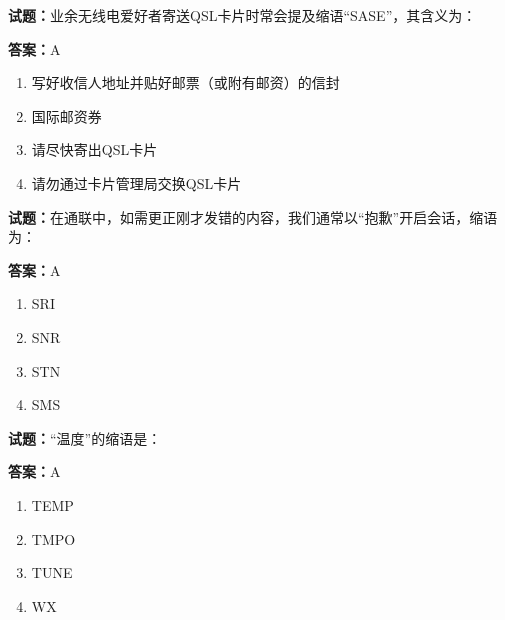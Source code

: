 \documentclass{ctexbook}
\begin{document}




\vspace{1em}

\textbf{试题：}业余无线电爱好者寄送QSL卡片时常会提及缩语“SASE”，其含义为： 

\textbf{答案：}A 

\begin{enumerate}[leftmargin=3em]
  \item 写好收信人地址并贴好邮票（或附有邮资）的信封 

  \item 国际邮资券 

  \item 请尽快寄出QSL卡片 

  \item 请勿通过卡片管理局交换QSL卡片 

\end{enumerate}





\vspace{1em}

\textbf{试题：}在通联中，如需更正刚才发错的内容，我们通常以“抱歉”开启会话，缩语为： 

\textbf{答案：}A 

\begin{enumerate}[leftmargin=3em]
  \item SRI 

  \item SNR 


  \item STN 

  \item SMS 

\end{enumerate}





\vspace{1em}

\textbf{试题：}“温度”的缩语是： 

\textbf{答案：}A 

\begin{enumerate}[leftmargin=3em]
  \item TEMP 

  \item TMPO 

  \item TUNE 

  \item WX 

\end{enumerate}
\end{document}

